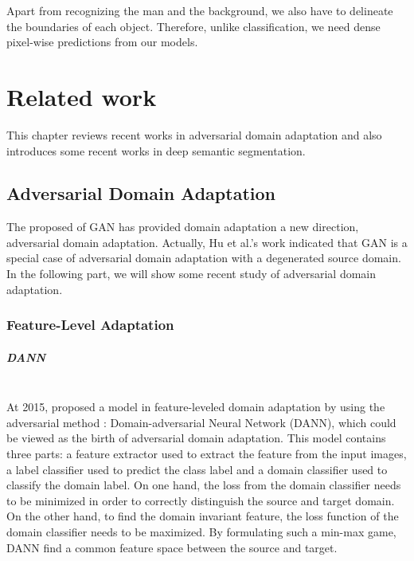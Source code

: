 \documentclass{kththesis}
\begin{document}
\noindent Apart from recognizing the man and the background, we also have to delineate the boundaries of each object. Therefore, unlike classification, we need dense pixel-wise predictions from our models.

\chapter{Related work}

This chapter reviews recent works in adversarial domain adaptation and also introduces some recent works in deep semantic segmentation. 
\section{Adversarial Domain Adaptation}

The proposed of GAN\cite{goodfellow2014generative} has provided domain adaptation a new direction, adversarial domain adaptation. Actually, Hu et al.'s \cite{hu2017unifying} work indicated that GAN is a special case of adversarial domain adaptation with a degenerated source domain. In the following part, we will show some recent study of adversarial domain adaptation.

\subsection{Feature-Level Adaptation}

\paragraph{DANN}~{}\\


\noindent At 2015, \cite{ganin2015unsupervised,ganin2016domain} proposed a model in feature-leveled domain adaptation by using the adversarial method \cite{goodfellow2014generative}: Domain-adversarial Neural Network (DANN), which could be viewed as the birth of adversarial domain adaptation. This model contains three parts: a feature extractor used to extract the feature from the input images, a label classifier used to predict the class label and a domain classifier used to classify the domain label. On one hand, the loss from the domain classifier needs to be minimized in order to correctly distinguish the source and target domain. On the other hand, to find the domain invariant feature, the loss function of the domain classifier needs to be maximized. By formulating such a min-max game, DANN find a common feature space between the source and target. 
\end{document}
